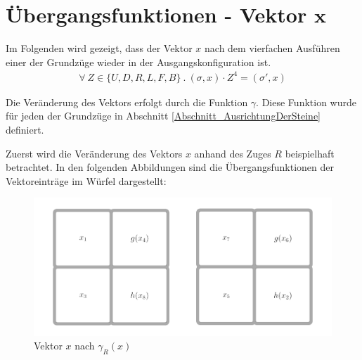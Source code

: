 \documentclass[12pt,a4paper, usenames, dvipsnames]{article}
\theoremstyle{mystyle}
\theoremstyle{definition}
\begin{document}
%
%
%
%
%
%
%
%
%
%
%
%
%
%
%
%
%
%
%

\newpage


\begin{spacing}{0.8}
\listoffigures
\end{spacing}

%
%
%
%
%
%
%
%
%
%
%
%
%
%
%
%
%
%

\newpage

\begin{spacing}{1.25}
\printbibliography
\end{spacing}


%
%
%
%
%
%
%
%
%
%
%
%
%
%
%
%
%
%
%
\newpage
\appendix



\section{Übergangsfunktionen - Vektor $\pmb{x}$}

\label{Anhang_Ausrichtungsfunktionen}

Im Folgenden wird gezeigt, dass der Vektor $x$ nach dem vierfachen Ausführen einer der Grundzüge wieder in der Ausgangskonfiguration ist. 
\begin{align*}
\forall \ Z \in \{U, D, R, L, F, B\} \ . \ (\sigma, x) \cdot Z^4 = (\sigma', x)
\end{align*}

Die Veränderung des Vektors erfolgt durch die Funktion $\gamma$. Diese Funktion wurde für jeden der Grundzüge in Abschnitt \ref{Abschnitt_AusrichtungDerSteine} definiert.

Zuerst wird die Veränderung des Vektors $x$ anhand des Zuges $R$ beispielhaft betrachtet. In den folgenden Abbildungen sind die Übergangsfunktionen der Vektoreinträge im Würfel dargestellt:

\begin{figure}[H]
\centering
\includegraphics[scale=0.15]{Rhoch1.jpg}
\caption{Vektor $x$ nach $\gamma_R(x)$}
\end{figure}
\end{document}
